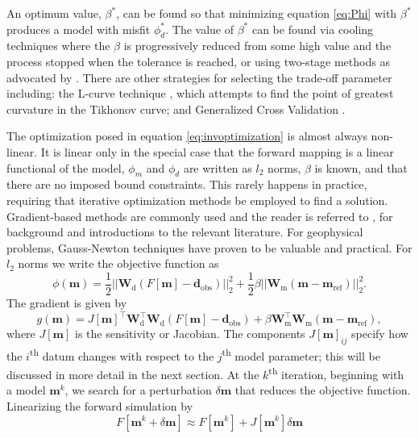 \documentclass[preprint,review,3p,times,onecolumn,authoryear]{elsarticle}
\newcommand{\dobs}{\mathbf{d}_\text{obs}}
\newcommand{\m}{\mathbf{m}}
\newcommand{\mref}{\mathbf{m}_\text{ref}}
\newcommand{\Wd}{\mathbf{W}_\text{d}}
\newcommand{\Wm}{\mathbf{W}_\text{m}}
\begin{document}
An optimum value, $\beta^*$, can be found
so that minimizing equation \ref{eq:Phi} with $\beta^*$ produces a model with misfit $\phi_d^*$. The
value of $\beta^*$ can be found via cooling techniques where the $\beta$ is progressively
reduced from some high value and the process stopped when the tolerance is reached, or using
two-stage methods as advocated by {\cite{Parker1977}}.
There are other strategies for selecting the trade-off parameter including:
the L-curve technique \citep{hansen1992analysis}, which attempts to find the point of greatest curvature in the Tikhonov curve;
and Generalized Cross Validation \citep{wahba1990spline,golub1979generalized,golub1997generalized,haber2000gcv,DougTutorial,Farquharson2004}.

The optimization posed in equation \ref{eq:invoptimization} is almost always non-linear.
It is linear only in the special case that the forward mapping is a linear functional
of the model, $\phi_m$ and $\phi_d$ are written as $l_2$ norms, $\beta$ is known, and that there are no
imposed bound constraints. This rarely happens in practice, requiring that iterative optimization methods be employed to find a solution.
Gradient-based methods are commonly used and the reader is referred to \cite{Nocedal1999},
for background and introductions to the relevant literature. For geophysical problems,
Gauss-Newton techniques have proven to be valuable and practical. For $l_2$ norms we
write the objective function as
{%
\begin{equation}
\phi(\m) = \frac{1}{2}||\Wd(F[\m]-\dobs)||^2_2 + \frac{1}{2} \beta ||\Wm(\m-\mref)||^2_2.
\end{equation}
}
The gradient is given by
{%
\begin{equation}
g(\m)= J[\m]^\top \Wd^\top \Wd(F[\m]-\dobs) + \beta \Wm^\top \Wm (\m-\mref),
\end{equation}
}
where $J[\m]$ is the sensitivity or Jacobian. The components $J[\mathbf{m}]_{ij}$ specify how the $i$\textsuperscript{th} datum
changes with respect to the $j$\textsuperscript{th} model parameter; this will be discussed in more detail in the next section. At the $k$\textsuperscript{th} iteration, beginning with a model $\m^{k}$,
we search for a perturbation $\delta \m$ that reduces the objective function.
Linearizing the forward simulation by
{%
\begin{equation}
F[\m^{k}+\delta \m] \approx F[\m^{k}] + J[\m^{k}]\delta \m %
\end{equation}
}
\end{document}
